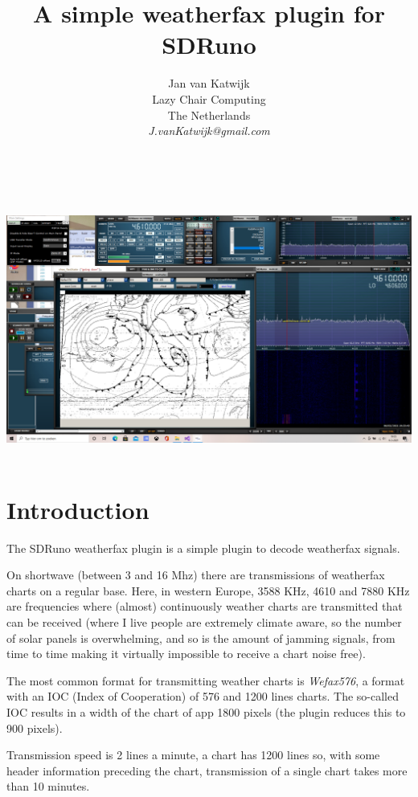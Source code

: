 \documentclass[11pt]{article}
\begin{document}
\title{A simple weatherfax plugin for SDRuno}
\author{
Jan van Katwijk\\
Lazy Chair Computing \\
The Netherlands\\
{\em J.vanKatwijk@gmail.com}}
\maketitle
\ \\
\ \\
\includegraphics[width=150mm]{wfax-example.png}
\ \\
\section{Introduction}
The SDRuno weatherfax plugin is a simple plugin to decode weatherfax signals.

On shortwave (between 3 and 16 Mhz) there are
transmissions of weatherfax charts on a regular base.
Here, in western Europe, 3588 KHz, 4610 and 7880 KHz are frequencies where
(almost) continuously weather charts are transmitted that can be received
(where I live people are extremely climate aware, so the number of
solar panels is overwhelming, and so is the amount of jamming signals,
from time to time making it virtually impossible
to receive a chart noise free).

The most common format for transmitting weather charts is
{\em Wefax576}, a format with an IOC (Index of Cooperation)
of 576 and 1200 lines charts.
The so-called IOC results in a width of the chart of
app 1800 pixels (the plugin reduces this to 900 pixels).

Transmission speed is 2 lines a minute, a chart has 1200 lines
so, with some header information preceding the chart, transmission
of a single chart takes more than 10 minutes.
\end{document}
